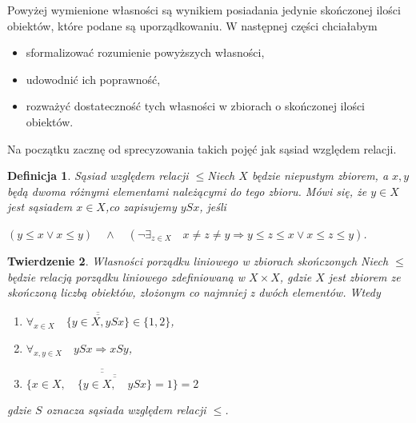 \documentclass[12pt,a4paper]{report}
\newtheorem{theorem}{Twierdzenie}[section]
\newtheorem{definition}[theorem]{Definicja}
\newcommand{\licznosc}[1]{\overline{\overline{#1}}}
\begin{document}
Powyżej wymienione własności są wynikiem posiadania jedynie skończonej ilości obiektów, które podane są uporządkowaniu. W następnej części chciałabym 
\begin{itemize}
\item sformalizować rozumienie powyższych własności,
\item udowodnić ich poprawność,
\item rozważyć dostateczność tych własności w zbiorach o skończonej ilości obiektów.
\end{itemize}


Na początku zacznę od sprecyzowania takich pojęć jak sąsiad względem relacji.

\begin{definition}{Sąsiad względem relacji $\leq$}\label{def-sasiada}
Niech  $X$ będzie niepustym zbiorem, a $x, y$ będą dwoma różnymi elementami należącymi do tego zbioru. Mówi się, że $y \in X$ jest sąsiadem $x \in X$,co zapisujemy $ySx$, jeśli

$\left(y \leq x \lor x \leq y \right) \quad \land \quad  \left(\lnot \exists_{z \in X}  \quad x\neq z \neq y \Rightarrow   y \leq z \leq x \lor x \leq z \leq y \right)$.

\end{definition}


\begin{theorem}{Własności porządku liniowego w zbiorach skończonych}
Niech $\leq$ będzie relacją porządku liniowego zdefiniowaną w $X \times X$, gdzie $X$ jest zbiorem ze skończoną liczbą obiektów, złożonym co najmniej z dwóch elementów. Wtedy
\begin{enumerate}
\item $\forall_{x \in X} \quad \licznosc{\{y \in X, ySx\}} \in \{1,2\}$,
\item $\forall_{x, y \in X} \quad ySx \Rightarrow xSy $,
\item $\licznosc{\{x \in X, \quad \licznosc{\{y \in X, \quad ySx \}}=1\}}=2$
\end{enumerate}
gdzie $S$ oznacza sąsiada względem relacji $\leq$.
\end{theorem}
\end{document}

